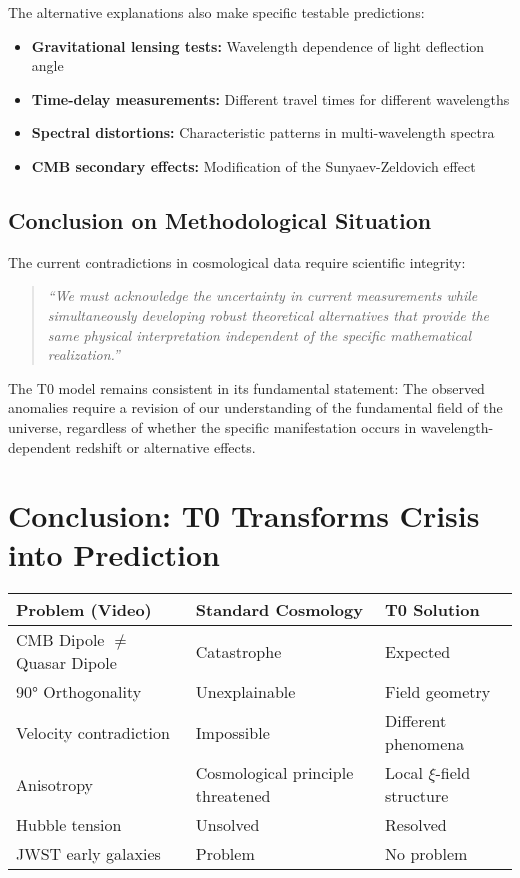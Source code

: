 \documentclass{article}
\begin{document}
	The alternative explanations also make specific testable predictions:
	
	\begin{itemize}
		\item \textbf{Gravitational lensing tests:} Wavelength dependence of light deflection angle
		\item \textbf{Time-delay measurements:} Different travel times for different wavelengths
		\item \textbf{Spectral distortions:} Characteristic patterns in multi-wavelength spectra
		\item \textbf{CMB secondary effects:} Modification of the Sunyaev-Zeldovich effect
	\end{itemize}
	
	\subsection{Conclusion on Methodological Situation}
	
	The current contradictions in cosmological data require scientific integrity:
	
	\begin{quote}
		\textit{``We must acknowledge the uncertainty in current measurements while simultaneously developing robust theoretical alternatives that provide the same physical interpretation independent of the specific mathematical realization.''}
	\end{quote}
	
	The T0 model remains consistent in its fundamental statement: The observed anomalies require a revision of our understanding of the fundamental field of the universe, regardless of whether the specific manifestation occurs in wavelength-dependent redshift or alternative effects.
	
	\section{Conclusion: T0 Transforms Crisis into Prediction}
	
	\begin{tabular}{p{3.5cm}|p{6cm}|p{5.5cm}}
		\textbf{Problem (Video)} & \textbf{Standard Cosmology} & \textbf{T0 Solution} \\
		\hline
		CMB Dipole $\neq$ Quasar Dipole & Catastrophe \cite{mittal2024} & Expected \\
		90° Orthogonality & Unexplainable \cite{secrest2024} & Field geometry \\
		Velocity contradiction & Impossible & Different phenomena \\
		Anisotropy & Cosmological principle threatened & Local $\xi$-field structure \\
		Hubble tension & Unsolved & Resolved \\
		JWST early galaxies & Problem & No problem \\
	\end{tabular}
	
\end{document}
